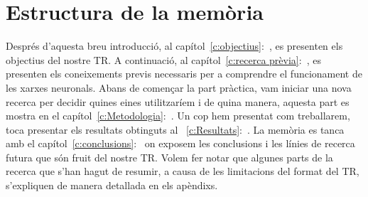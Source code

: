 \section{Estructura de la memòria}
\vspace{-0.3truecm}
Després d'aquesta breu introducció, al capítol~\ref{c:objectius}:~, es presenten els objectius del nostre TR. A continuació, al capítol~\ref{c:recerca prèvia}:~, es presenten els coneixements previs necessaris per a comprendre el funcionament de les xarxes neuronals.
Abans de començar la part pràctica, vam iniciar una nova recerca per decidir quines eines utilitzaríem i de quina manera, aquesta part es mostra en el capítol~\ref{c:Metodologia}:~.
Un cop hem presentat com treballarem, toca presentar els resultats obtinguts al ~\ref{c:Resultats}:~.
La memòria es tanca amb el capítol~\ref{c:conclusions}:~ on exposem les conclusions i les línies de recerca futura que són fruit del nostre TR.
Volem fer notar que algunes parts de la recerca que s'han hagut de resumir, a causa de les limitacions del format del TR, s'expliquen de manera detallada en els apèndixs.

